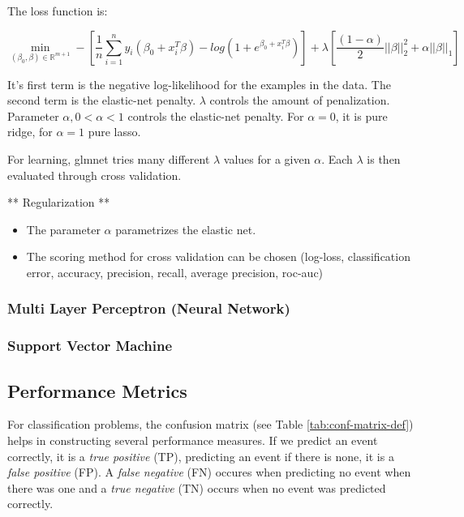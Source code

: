 \documentclass[
  11pt,
  a4paper,
  DIV=12,captions=tableheading,oneside]{scrbook}
\providecommand{\tightlist}{%
  \setlength{\itemsep}{0pt}\setlength{\parskip}{0pt}}
\providecommand{\tightlist}{%
  \setlength{\itemsep}{0pt}\setlength{\parskip}{0pt}}
\begin{document}
The loss function is:

\begin{equation}
\min_{(\beta_0,\beta) \in \mathbb{R}^{m+1}} - \left[\frac{1}{n}\sum_{i=1}^ny_i(\beta_0+x_i^T\beta)-log(1+e^{\beta_0+x_i^T\beta})\right] + \lambda\left[\frac{(1-\alpha)}{2}||\beta||_2^2+\alpha||\beta||_1\right]
\label{eq:glmnet}
\end{equation}

It's first term is the negative log-likelihood for the examples in the data. The second term is the elastic-net penalty. \(\lambda\) controls the amount of penalization. Parameter \(\alpha, 0 < \alpha < 1\) controls the elastic-net penalty. For \(\alpha = 0\), it is pure ridge, for \(\alpha = 1\) pure lasso.

For learning, glmnet tries many different \(\lambda\) values for a given \(\alpha\). Each \(\lambda\) is then evaluated through cross validation.

** Regularization **

\begin{itemize}
\tightlist
\item
  The parameter \(\alpha\) parametrizes the elastic net.
\item
  The scoring method for cross validation can be chosen (log-loss, classification error, accuracy, precision, recall, average precision, roc-auc)
\end{itemize}

\hypertarget{multi-layer-perceptron-neural-network}{%
\subsubsection{Multi Layer Perceptron (Neural Network)}\label{multi-layer-perceptron-neural-network}}

\hypertarget{support-vector-machine}{%
\subsubsection{Support Vector Machine}\label{support-vector-machine}}

\hypertarget{performance-metrics}{%
\subsection{Performance Metrics}\label{performance-metrics}}

For classification problems, the confusion matrix (see Table \ref{tab:conf-matrix-def}) helps in constructing several performance measures. If we predict an event correctly, it is a \emph{true positive} (TP), predicting an event if there is none, it is a \emph{false positive} (FP). A \emph{false negative} (FN) occures when predicting no event when there was one and a \emph{true negative} (TN) occurs when no event was predicted correctly.
\end{document}
